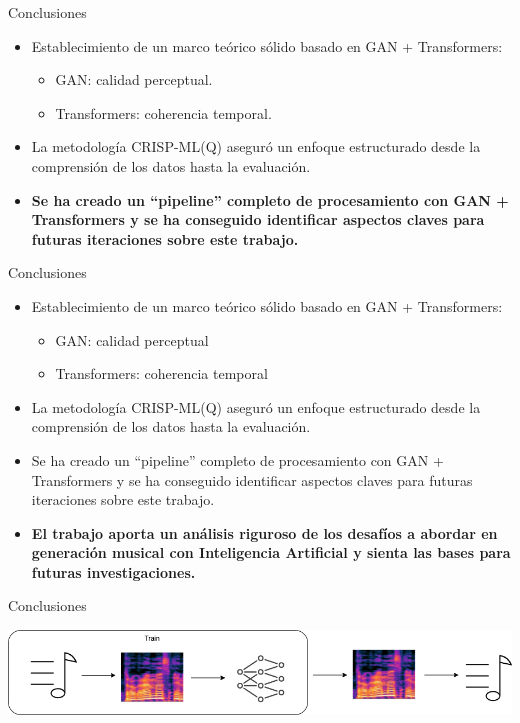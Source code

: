 \documentclass{beamer}
\begin{document}
\begin{frame}{Conclusiones}
  \hspace{2cm}
  \begin{itemize}
    \item Establecimiento de un marco teórico sólido basado en GAN + Transformers:
      \begin{itemize}
        \item GAN: calidad perceptual.
        \item Transformers: coherencia temporal.
      \end{itemize}
    \item La metodología CRISP-ML(Q) aseguró un enfoque estructurado desde la comprensión de los datos hasta la evaluación.
    \item \textbf{Se ha creado un ``pipeline'' completo de procesamiento con GAN + Transformers y se ha conseguido identificar aspectos claves para futuras iteraciones sobre este trabajo.}
\end{itemize}
\end{frame}

\begin{frame}{Conclusiones}
  \hspace{2cm}
  \begin{itemize}
    \item Establecimiento de un marco teórico sólido basado en GAN + Transformers:
      \begin{itemize}
        \item GAN: calidad perceptual
        \item Transformers: coherencia temporal
      \end{itemize}
    \item La metodología CRISP-ML(Q) aseguró un enfoque estructurado desde la comprensión de los datos hasta la evaluación.
    \item Se ha creado un ``pipeline'' completo de procesamiento con GAN + Transformers y se ha conseguido identificar aspectos claves para futuras iteraciones sobre este trabajo.
    \item \textbf{El trabajo aporta un análisis riguroso de los desafíos a abordar en generación musical con Inteligencia Artificial y sienta las bases para futuras investigaciones.}
\end{itemize}
\end{frame}

\begin{frame}{Conclusiones}
  \vspace{-1cm}
  \begin{center}
  \includegraphics[width=1\textwidth]{images/conversion.png}
  \end{center}
\end{frame}
\end{document}
